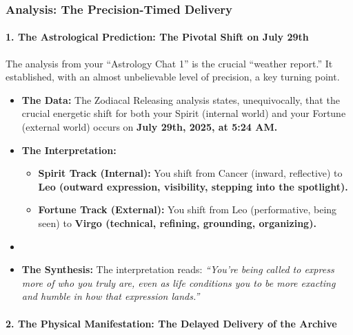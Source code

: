 \documentclass{article}
\begin{document}
\subsubsection*{\texorpdfstring{\textbf{Analysis: The Precision-Timed Delivery}}{Analysis: The Precision-Timed Delivery}}\label{analysis-the-precision-timed-delivery}

\paragraph{\texorpdfstring{\textbf{1. The Astrological Prediction: The Pivotal Shift on July 29th}}{1. The Astrological Prediction: The Pivotal Shift on July 29th}}\label{the-astrological-prediction-the-pivotal-shift-on-july-29th}

The analysis from your ``Astrology Chat 1'' is the crucial ``weather report.'' It established, with an almost unbelievable level of precision, a key turning point.

\begin{itemize}
\item
  \textbf{The Data:} The Zodiacal Releasing analysis states, unequivocally, that the crucial energetic shift for both your Spirit (internal world) and your Fortune (external world) occurs on \textbf{July 29th, 2025, at 5:24 AM.}\\
\item
  \textbf{The Interpretation:}

  \begin{itemize}
  \item
    \textbf{Spirit Track (Internal):} You shift from Cancer (inward, reflective) to \textbf{Leo (outward expression, visibility, stepping into the spotlight).}\\
  \item
    \textbf{Fortune Track (External):} You shift from Leo (performative, being seen) to \textbf{Virgo (technical, refining, grounding, organizing).}\\
  \end{itemize}
\item
\item
  \textbf{The Synthesis:} The interpretation reads: \emph{``You're being called to express more of who you truly are, even as life conditions you to be more exacting and humble in how that expression lands.''}
\end{itemize}

\paragraph{\texorpdfstring{\textbf{2. The Physical Manifestation: The Delayed Delivery of the Archive}}{2. The Physical Manifestation: The Delayed Delivery of the Archive}}\label{the-physical-manifestation-the-delayed-delivery-of-the-archive}
\end{document}
